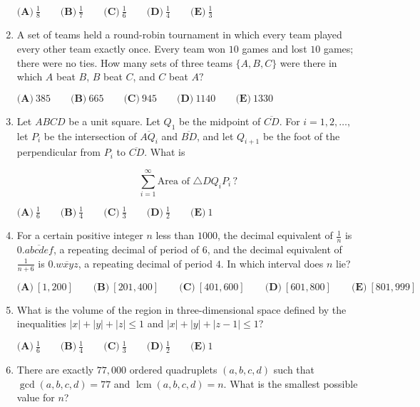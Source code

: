 \documentclass{article}
\begin{document}
\begin{enumerate}[label=\arabic*., itemsep=0.5em]
$\textbf{(A)}\ \frac{1}{8} \qquad
\textbf{(B)}\ \frac{1}{7} \qquad
\textbf{(C)}\ \frac{1}{6} \qquad
\textbf{(D)}\ \frac{1}{4} \qquad
\textbf{(E)}\ \frac{1}{3}$\par \vspace{0.5em}\item A set of teams held a round-robin tournament in which every team played every other team exactly once. Every team won $10$ games and lost $10$ games; there were no ties. How many sets of three teams $\{A, B, C\}$ were there in which $A$ beat $B$, $B$ beat $C$, and $C$ beat $A?$

$\textbf{(A)}\ 385 \qquad
\textbf{(B)}\ 665 \qquad
\textbf{(C)}\ 945 \qquad
\textbf{(D)}\ 1140 \qquad
\textbf{(E)}\ 1330$\par \vspace{0.5em}\item Let $ABCD$ be a unit square. Let $Q_1$ be the midpoint of $\overline{CD}$. For $i=1,2,\dots,$ let $P_i$ be the intersection of $\overline{AQ_i}$ and $\overline{BD}$, and let $Q_{i+1}$ be the foot of the perpendicular from $P_i$ to $\overline{CD}$. What is 

\begin{equation*}
\sum_{i=1}^{\infty} \text{Area of } \triangle DQ_i P_i \, ?
\end{equation*}


$\textbf{(A)}\ \frac{1}{6} \qquad
\textbf{(B)}\ \frac{1}{4} \qquad
\textbf{(C)}\ \frac{1}{3} \qquad
\textbf{(D)}\ \frac{1}{2} \qquad
\textbf{(E)}\ 1$\par \vspace{0.5em}\item For a certain positive integer $n$ less than $1000$, the decimal equivalent of $\frac{1}{n}$ is $0.\overline{abcdef}$, a repeating decimal of period of $6$, and the decimal equivalent of $\frac{1}{n+6}$ is $0.\overline{wxyz}$, a repeating decimal of period $4$. In which interval does $n$ lie?

$\textbf{(A)}\ [1,200]\qquad\textbf{(B)}\ [201,400]\qquad\textbf{(C)}\ [401,600]\qquad\textbf{(D)}\ [601,800]\qquad\textbf{(E)}\ [801,999]$\par \vspace{0.5em}\item What is the volume of the region in three-dimensional space defined by the inequalities $|x|+|y|+|z|\le1$ and $|x|+|y|+|z-1|\le1$?

$\textbf{(A)}\ \frac{1}{6}\qquad\textbf{(B)}\ \frac{1}{4}\qquad\textbf{(C)}\ \frac{1}{3}\qquad\textbf{(D)}\ \frac{1}{2}\qquad\textbf{(E)}\ 1$\par \vspace{0.5em}\item There are exactly $77,000$ ordered quadruplets $(a, b, c, d)$ such that $\gcd(a, b, c, d) = 77$ and $\operatorname{lcm}(a, b, c, d) = n$. What is the smallest possible value for $n$?


\end{enumerate}
\end{document}
